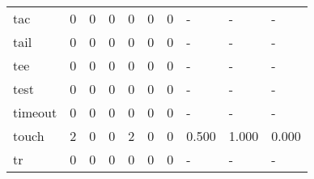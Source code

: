 \begin{longtable}{lp{2.0cm}p{2.0cm}p{2.0cm}p{2.0cm}p{2.0cm}p{2.0cm}p{2.0cm}p{2.0cm}p{2.0cm}}
tac       &                      0 &                                             0 &                                            0 &                                           0 &                                            0 &                                          0 &                                    - &                                      - &                                    - \\
tail      &                      0 &                                             0 &                                            0 &                                           0 &                                            0 &                                          0 &                                    - &                                      - &                                    - \\
tee       &                      0 &                                             0 &                                            0 &                                           0 &                                            0 &                                          0 &                                    - &                                      - &                                    - \\
test      &                      0 &                                             0 &                                            0 &                                           0 &                                            0 &                                          0 &                                    - &                                      - &                                    - \\
timeout   &                      0 &                                             0 &                                            0 &                                           0 &                                            0 &                                          0 &                                    - &                                      - &                                    - \\
touch     &                      2 &                                             0 &                                            0 &                                           2 &                                            0 &                                          0 &                                0.500 &                                  1.000 &                                0.000 \\
tr        &                      0 &                                             0 &                                            0 &                                           0 &                                            0 &                                          0 &                                    - &                                      - &                                    - \\

\end{longtable}
